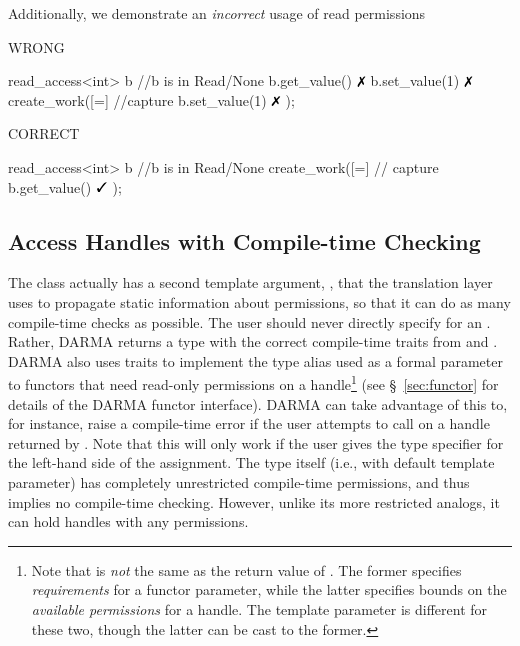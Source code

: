 Additionally, we demonstrate an \emph{incorrect} usage of read permissions

\begin{minipage}[t]{0.45\linewidth}
\centering
\centering WRONG
\begin{vaspPseudo}
read_access<int> b
//b is in Read/None
b.get_value()   $\no$
b.set_value(1)  $\no$
create_work([=]{ //capture
  b.set_value(1) $\no$
});
\end{vaspPseudo}
\end{minipage}
\begin{minipage}[t]{0.45\linewidth}
\centering
\centering CORRECT
\begin{vaspPseudo}
read_access<int> b
//b is in Read/None
create_work([=]{ // capture
  b.get_value()  $\yes$
});
\end{vaspPseudo}
\end{minipage}

\subsection{Access Handles with Compile-time Checking}
\label{ssec:ahtraits}

The \ahandleT class actually has a second template argument,
, that the translation layer uses to propagate static
information about permissions, so that it can do as many compile-time checks as
possible.  The user should never directly specify  for an
\ahandleT.  Rather, DARMA returns a type with the correct compile-time traits
from  and .  DARMA also uses
traits to implement the  type alias
used as a formal parameter to functors that need read-only permissions on a
handle\footnote{Note that  is {\it not} the same
as the return value of .  The former specifies {\it
requirements} for a functor parameter, while the latter specifies bounds on
the {\it available permissions} for a handle.  The  template
parameter is different for these two, though the latter can be cast to the former.} (see
\S~\ref{sec:functor} for details of the DARMA functor interface).  DARMA can
take advantage of this to, for instance, raise a compile-time error if the user
attempts to call  on a handle returned by
.  Note that this will only work if the user gives
the  type specifier for the left-hand side of the assignment. 
The type \ahandleT itself (i.e., with default  template
parameter) has completely unrestricted compile-time permissions, and thus
implies no compile-time checking.  However, unlike its more restricted analogs,
it can hold handles with any permissions.

